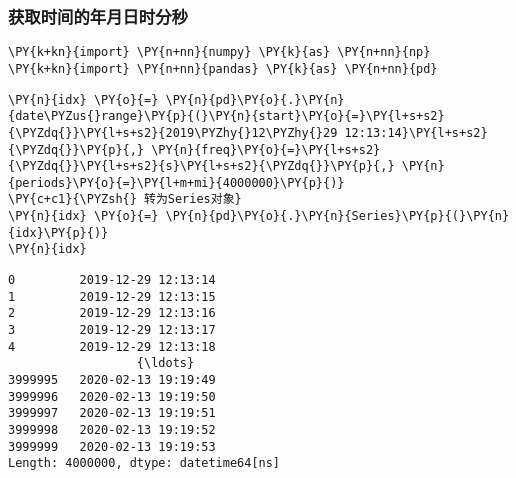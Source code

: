     \hypertarget{ux83b7ux53d6ux65f6ux95f4ux7684ux5e74ux6708ux65e5ux65f6ux5206ux79d2}{%
\subsubsection{获取时间的年月日时分秒}\label{ux83b7ux53d6ux65f6ux95f4ux7684ux5e74ux6708ux65e5ux65f6ux5206ux79d2}}

    \begin{tcolorbox}[breakable, size=fbox, boxrule=1pt, pad at break*=1mm,colback=cellbackground, colframe=cellborder]
\begin{Verbatim}[commandchars=\\\{\}]
\PY{k+kn}{import} \PY{n+nn}{numpy} \PY{k}{as} \PY{n+nn}{np}
\PY{k+kn}{import} \PY{n+nn}{pandas} \PY{k}{as} \PY{n+nn}{pd}
\end{Verbatim}
\end{tcolorbox}

    \begin{tcolorbox}[breakable, size=fbox, boxrule=1pt, pad at break*=1mm,colback=cellbackground, colframe=cellborder]
\begin{Verbatim}[commandchars=\\\{\}]
\PY{n}{idx} \PY{o}{=} \PY{n}{pd}\PY{o}{.}\PY{n}{date\PYZus{}range}\PY{p}{(}\PY{n}{start}\PY{o}{=}\PY{l+s+s2}{\PYZdq{}}\PY{l+s+s2}{2019\PYZhy{}12\PYZhy{}29 12:13:14}\PY{l+s+s2}{\PYZdq{}}\PY{p}{,} \PY{n}{freq}\PY{o}{=}\PY{l+s+s2}{\PYZdq{}}\PY{l+s+s2}{s}\PY{l+s+s2}{\PYZdq{}}\PY{p}{,} \PY{n}{periods}\PY{o}{=}\PY{l+m+mi}{4000000}\PY{p}{)}
\PY{c+c1}{\PYZsh{} 转为Series对象}
\PY{n}{idx} \PY{o}{=} \PY{n}{pd}\PY{o}{.}\PY{n}{Series}\PY{p}{(}\PY{n}{idx}\PY{p}{)}
\PY{n}{idx}
\end{Verbatim}
\end{tcolorbox}

            \begin{tcolorbox}[breakable, size=fbox, boxrule=.5pt, pad at break*=1mm, opacityfill=0]
\begin{Verbatim}[commandchars=\\\{\}]
0         2019-12-29 12:13:14
1         2019-12-29 12:13:15
2         2019-12-29 12:13:16
3         2019-12-29 12:13:17
4         2019-12-29 12:13:18
                  {\ldots}
3999995   2020-02-13 19:19:49
3999996   2020-02-13 19:19:50
3999997   2020-02-13 19:19:51
3999998   2020-02-13 19:19:52
3999999   2020-02-13 19:19:53
Length: 4000000, dtype: datetime64[ns]
\end{Verbatim}
\end{tcolorbox}
        
